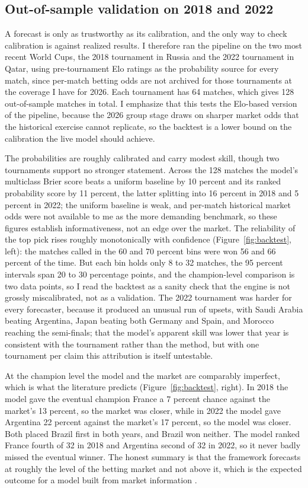 \documentclass[11pt,letterpaper]{article}
\begin{document}
\subsection{Out-of-sample validation on 2018 and 2022}\label{sec:backtest}

A forecast is only as trustworthy as its calibration, and the only way to check calibration is against realized results. I therefore ran the pipeline on the two most recent World Cups, the 2018 tournament in Russia and the 2022 tournament in Qatar, using pre-tournament Elo ratings as the probability source for every match, since per-match betting odds are not archived for those tournaments at the coverage I have for 2026. Each tournament has 64 matches, which gives 128 out-of-sample matches in total. I emphasize that this tests the Elo-based version of the pipeline, because the 2026 group stage draws on sharper market odds that the historical exercise cannot replicate, so the backtest is a lower bound on the calibration the live model should achieve.

The probabilities are roughly calibrated and carry modest skill, though two tournaments support no stronger statement. Across the 128 matches the model's multiclass Brier score beats a uniform baseline by 10 percent and its ranked probability score \citep{constantinou2012} by 11 percent, the latter splitting into 16 percent in 2018 and 5 percent in 2022; the uniform baseline is weak, and per-match historical market odds were not available to me as the more demanding benchmark, so these figures establish informativeness, not an edge over the market. The reliability of the top pick rises roughly monotonically with confidence (Figure~\ref{fig:backtest}, left): the matches called in the 60 and 70 percent bins were won 56 and 66 percent of the time. But each bin holds only 8 to 32 matches, the 95 percent intervals span 20 to 30 percentage points, and the champion-level comparison is two data points, so I read the backtest as a sanity check that the engine is not grossly miscalibrated, not as a validation. The 2022 tournament was harder for every forecaster, because it produced an unusual run of upsets, with Saudi Arabia beating Argentina, Japan beating both Germany and Spain, and Morocco reaching the semi-finals; that the model's apparent skill was lower that year is consistent with the tournament rather than the method, but with one tournament per claim this attribution is itself untestable.

At the champion level the model and the market are comparably imperfect, which is what the literature predicts (Figure~\ref{fig:backtest}, right). In 2018 the model gave the eventual champion France a 7 percent chance against the market's 13 percent, so the market was closer, while in 2022 the model gave Argentina 22 percent against the market's 17 percent, so the model was closer. Both placed Brazil first in both years, and Brazil won neither. The model ranked France fourth of 32 in 2018 and Argentina second of 32 in 2022, so it never badly missed the eventual winner. The honest summary is that the framework forecasts at roughly the level of the betting market and not above it, which is the expected outcome for a model built from market information \citep{strumbelj2014, hvattum2010}.
\end{document}
